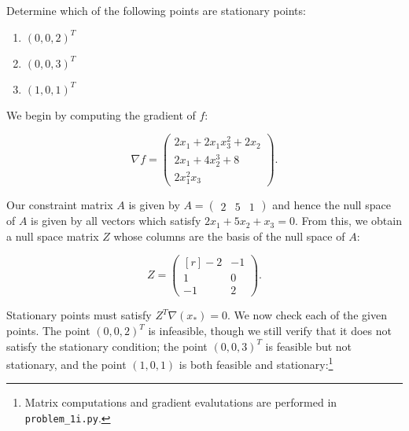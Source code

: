 Determine which of the following points are stationary points:

\begin{enumerate}
    \item $(0, 0, 2)^T$
    \item $(0, 0, 3)^T$
    \item $(1, 0, 1)^T$
\end{enumerate}

\begin{solution}
    We begin by computing the gradient of $f$:

    $$
    \nabla f = \begin{pmatrix*}
        2 x_1 + 2 x_1 x_3^2 + 2 x_2 \\
        2 x_1 + 4 x_2^3 + 8 \\
        2x_1^2 x_3
    \end{pmatrix*}.
    $$

    Our constraint matrix $A$ is given by $A = \begin{pmatrix*}2 &  5 & 1\end{pmatrix*}$ and hence the null space of $A$ 
    is given by all vectors which satisfy $2 x_1 + 5 x_2 + x_3 = 0$. From this, we obtain a null space matrix $Z$ 
    whose columns are the basis of the null space of $A$:

    $$
    Z = \begin{pmatrix*}[r]
        -2 & -1 \\
         1 & 0  \\
        -1 & 2
    \end{pmatrix*}.
    $$

    Stationary points must satisfy $Z^T \nabla(x_*) = 0$. We now check each of the given points. The point $(0, 0, 2)^T$
    is infeasible, though we still verify that it does not satisfy the stationary condition; the point $(0, 0, 3)^T$ is 
    feasible but not stationary, and the point $(1, 0, 1)$ is both feasible and stationary:\footnote{
        Matrix computations and gradient evalutations are performed in \texttt{problem\_1i.py}.
    }


\end{solution}
